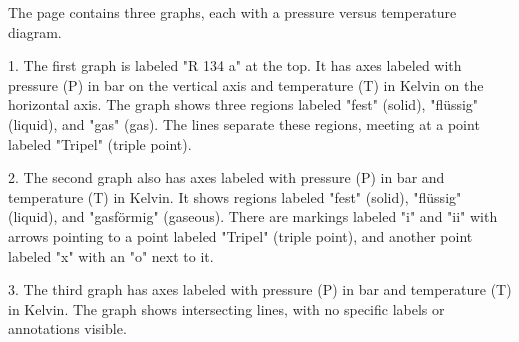 The page contains three graphs, each with a pressure versus temperature diagram.

1. The first graph is labeled "R 134 a" at the top. It has axes labeled with pressure (P) in bar on the vertical axis and temperature (T) in Kelvin on the horizontal axis. The graph shows three regions labeled "fest" (solid), "flüssig" (liquid), and "gas" (gas). The lines separate these regions, meeting at a point labeled "Tripel" (triple point).

2. The second graph also has axes labeled with pressure (P) in bar and temperature (T) in Kelvin. It shows regions labeled "fest" (solid), "flüssig" (liquid), and "gasförmig" (gaseous). There are markings labeled "i" and "ii" with arrows pointing to a point labeled "Tripel" (triple point), and another point labeled "x" with an "o" next to it.

3. The third graph has axes labeled with pressure (P) in bar and temperature (T) in Kelvin. The graph shows intersecting lines, with no specific labels or annotations visible.